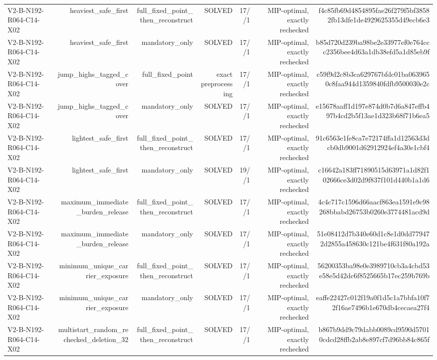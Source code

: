{\begin{longtable}{lrrrrrr}
V2-B-N192-R064-C14-X02 & heaviest\_safe\_first & full\_fixed\_point\_then\_reconstruct & SOLVED & 17//1 & MIP-optimal, exactly rechecked & f4c85fb69d4854895fae26f279f5bf38582fb13dfe1de4929625355d49ecb6e3 \\
V2-B-N192-R064-C14-X02 & heaviest\_safe\_first & mandatory\_only & SOLVED & 17//1 & MIP-optimal, exactly rechecked & b85d720d239ba98be2e33977ef0e764ccc2356bee4d63a1db38efd5a1d85eb9f \\
V2-B-N192-R064-C14-X02 & jump\_highs\_tagged\_cover & full\_fixed\_point & exact preprocessing & 17//1 & MIP-optimal, exactly rechecked & c59f9d2c8b3ca629767bfdc01ba0639650c8faa944d1359840fdfb9500030e2c \\
V2-B-N192-R064-C14-X02 & jump\_highs\_tagged\_cover & mandatory\_only & SOLVED & 17//1 & MIP-optimal, exactly rechecked & e15678aaff1d197e874d0b7d6a847effb497b4cd2b5f13ae1d323b68f71b6ea5 \\
V2-B-N192-R064-C14-X02 & lightest\_safe\_first & full\_fixed\_point\_then\_reconstruct & SOLVED & 17//1 & MIP-optimal, exactly rechecked & 91c6563e1fe8ca7e72174ffa1d12563d3dcb0db9001d62912924ef4a30e1cbf4 \\
V2-B-N192-R064-C14-X02 & lightest\_safe\_first & mandatory\_only & SOLVED & 19//1 & MIP-optimal, exactly rechecked & c16642a183ff71890515d63971a1d82f102666ce3d02d9f837f101d440b1a1d6 \\
V2-B-N192-R064-C14-X02 & maximum\_immediate\_burden\_release & full\_fixed\_point\_then\_reconstruct & SOLVED & 17//1 & MIP-optimal, exactly rechecked & 4c4c717c1596d66aacf863ea1591e9c98268bbabd26753b0260e3774481acd9d \\
V2-B-N192-R064-C14-X02 & maximum\_immediate\_burden\_release & mandatory\_only & SOLVED & 17//1 & MIP-optimal, exactly rechecked & 51e08412d7b340e60d1c8e1d0dd779472d2855a458630c121be4f631f80a192a \\
V2-B-N192-R064-C14-X02 & minimum\_unique\_carrier\_exposure & full\_fixed\_point\_then\_reconstruct & SOLVED & 17//1 & MIP-optimal, exactly rechecked & 56200353ba98e0e3989710cb3a4cbd53e58e5d42dc6f8525665b17ec259b769b \\
V2-B-N192-R064-C14-X02 & minimum\_unique\_carrier\_exposure & mandatory\_only & SOLVED & 17//1 & MIP-optimal, exactly rechecked & eaffe22427c012f19a0f1d5c1a7bbfa10f72f16ae7496b1e670db4cecaea27f4 \\
V2-B-N192-R064-C14-X02 & multistart\_random\_rechecked\_deletion\_32 & full\_fixed\_point\_then\_reconstruct & SOLVED & 17//1 & MIP-optimal, exactly rechecked & b867b9dd9c79dabb0089cd9590d57010cdcd28ffb2ab8e897cf7d96bb84c865f \\

\end{longtable}}
